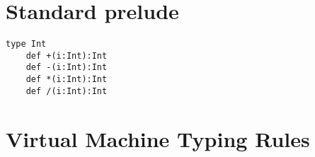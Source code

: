 \documentclass{article}
\begin{document}



\section{Standard prelude}

\begin{lstlisting}
type Int
    def +(i:Int):Int
    def -(i:Int):Int
    def *(i:Int):Int
    def /(i:Int):Int
\end{lstlisting}

\section{Virtual Machine Typing Rules}
\end{document}
